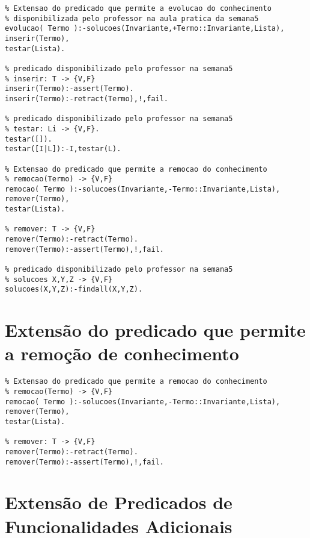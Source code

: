 \documentclass[
  oneside,
  10pt, a4paper,
  footinclude=true,
  headinclude=true,
  cleardoublepage=empty
]{scrbook}
\begin{document}
\begin{lstlisting}	
% Extensao do predicado que permite a evolucao do conhecimento
% disponibilizada pelo professor na aula pratica da semana5
evolucao( Termo ):-solucoes(Invariante,+Termo::Invariante,Lista),
inserir(Termo),
testar(Lista).

% predicado disponibilizado pelo professor na semana5
% inserir: T -> {V,F}
inserir(Termo):-assert(Termo).
inserir(Termo):-retract(Termo),!,fail.

% predicado disponibilizado pelo professor na semana5
% testar: Li -> {V,F}.
testar([]).
testar([I|L]):-I,testar(L).

% Extensao do predicado que permite a remocao do conhecimento
% remocao(Termo) -> {V,F}
remocao( Termo ):-solucoes(Invariante,-Termo::Invariante,Lista),
remover(Termo),
testar(Lista).

% remover: T -> {V,F}
remover(Termo):-retract(Termo).
remover(Termo):-assert(Termo),!,fail.

% predicado disponibilizado pelo professor na semana5
% solucoes X,Y,Z -> {V,F}
solucoes(X,Y,Z):-findall(X,Y,Z).
\end{lstlisting}

	
	\section{Extensão do predicado que permite a remoção de conhecimento}
	\label{remocao_anexo}
\begin{lstlisting}	
% Extensao do predicado que permite a remocao do conhecimento
% remocao(Termo) -> {V,F}
remocao( Termo ):-solucoes(Invariante,-Termo::Invariante,Lista),
remover(Termo),
testar(Lista).

% remover: T -> {V,F}
remover(Termo):-retract(Termo).
remover(Termo):-assert(Termo),!,fail.
\end{lstlisting}

	\section{Extensão de Predicados de Funcionalidades Adicionais}
	\label{extra_anexo}
	
\end{document}
